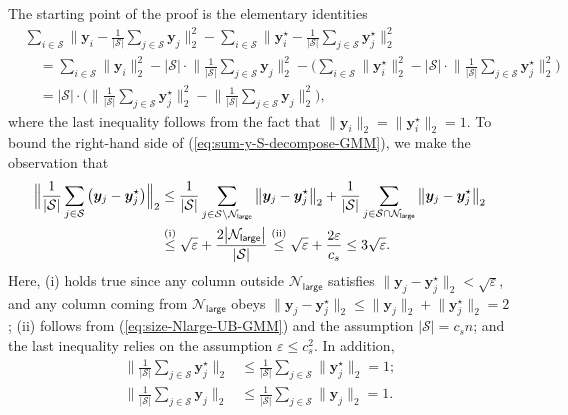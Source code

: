 %
The starting point of the proof is the elementary identities
\begin{align}
 &  \sum_{i\in\mathcal{S}}\Big\|\bm{y}_{i}-\frac{1}{|\mathcal{S}|}\sum_{j\in\mathcal{S}}\bm{y}_{j}\Big\|_{2}^{2}-\sum_{i\in\mathcal{S}}\Big\|\bm{y}_{i}^{\star}-\frac{1}{|\mathcal{S}|}\sum_{j\in\mathcal{S}}\bm{y}_{j}^{\star}\Big\|_{2}^{2}  \nonumber \\
 & \quad=\sum_{i\in\mathcal{S}}\big\|\bm{y}_{i}\big\|_{2}^{2}-|\mathcal{S}|\cdot\Big\|\frac{1}{|\mathcal{S}|}\sum_{j\in\mathcal{S}}\bm{y}_{j}\Big\|_{2}^{2}  - \Big( \sum_{i\in\mathcal{S}}\big\|\bm{y}_{i}^{\star}\big\|_{2}^{2}-|\mathcal{S}|\cdot\Big\|\frac{1}{|\mathcal{S}|}\sum_{j\in\mathcal{S}}\bm{y}_{j}^{\star}\Big\|_{2}^{2} \Big) \nonumber\\
 & \quad = |\mathcal{S}|\cdot \Bigg( \Big\|\frac{1}{|\mathcal{S}|}\sum_{j\in\mathcal{S}}\bm{y}_{j}^{\star}\Big\|_{2}^{2} -\Big\|\frac{1}{|\mathcal{S}|}\sum_{j\in\mathcal{S}}\bm{y}_{j}\Big\|_{2}^{2} \Bigg), \label{eq:sum-y-S-decompose-GMM}
\end{align}
where the last inequality follows from the fact that $\big\|\bm{y}_{i}\big\|_{2}=\big\|\bm{y}_{i}^{\star}\big\|_{2}=1$.
To bound the right-hand side of (\ref{eq:sum-y-S-decompose-GMM}),
we make the observation that
%
\begin{align}
\Big\|\frac{1}{|\mathcal{S}|}\sum_{j\in\mathcal{S}}\big(\bm{y}_{j}-\bm{y}_{j}^{\star}\big)\Big\|_{2} & \leq\frac{1}{|\mathcal{S}|}\sum_{j\in\mathcal{S}\backslash\mathcal{N}_{\mathsf{large}}}\big\|\bm{y}_{j}-\bm{y}_{j}^{\star}\big\|_{2}+\frac{1}{|\mathcal{S}|}\sum_{j\in\mathcal{S}\cap\mathcal{N}_{\mathsf{large}}}\big\|\bm{y}_{j}-\bm{y}_{j}^{\star}\big\|_{2}\notag\\
 & \overset{(\mathrm{i})}{\leq}\sqrt{\varepsilon}+\frac{2\big|\mathcal{N}_{\mathsf{large}}\big|}{|\mathcal{S}|}\overset{(\mathrm{ii})}{\leq}\sqrt{\varepsilon}+\frac{2\varepsilon}{c_{s}}\leq 3\sqrt{\varepsilon}. \label{eq:sum-y-diff}
\end{align}
%
Here, (i) holds true since any column outside $\mathcal{N}_{\mathsf{large}}$
satisfies $\big\|\bm{y}_{j}-\bm{y}_{j}^{\star}\big\|_{2} < \sqrt{\varepsilon}$,
and any column coming from $\mathcal{N}_{\mathsf{large}}$ obeys
$\big\|\bm{y}_{j}-\bm{y}_{j}^{\star}\big\|_{2}\leq\big\|\bm{y}_{j}\big\|_{2}+\big\|\bm{y}_{j}^{\star}\big\|_{2} = 2$;
(ii) follows from (\ref{eq:size-Nlarge-UB-GMM}) and the assumption
$|\mathcal{S}|=c_{s}n$; and the last inequality relies on the assumption
$\varepsilon\leq c_{s}^{2}$.
In addition,
%
\begin{subequations}\label{eq:sum-y-ub}
\begin{align}
\Big\|\frac{1}{|\mathcal{S}|}\sum_{j\in\mathcal{S}}\bm{y}_{j}^{\star}\Big\|_{2} &\leq\frac{1}{|\mathcal{S}|}\sum_{j\in\mathcal{S}}\big\|\bm{y}_{j}^{\star}\big\|_{2}=1; \\
\Big\|\frac{1}{|\mathcal{S}|}\sum_{j\in\mathcal{S}}\bm{y}_{j} \Big\|_{2} &\leq\frac{1}{|\mathcal{S}|}\sum_{j\in\mathcal{S}}\big\|\bm{y}_{j} \big\|_{2}=1.
\end{align}
\end{subequations}
